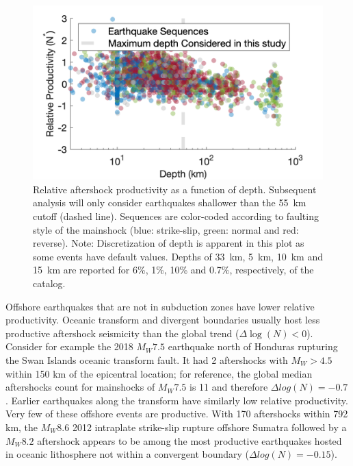 \documentclass[draft, jgrga]{agujournal2018}
\begin{document}
    \begin{figure}
        \centering
        \includegraphics{prod_vs_depth.png}
        \caption{Relative aftershock productivity as a function of depth. Subsequent analysis will only consider earthquakes shallower than the 55~km cutoff (dashed line). Sequences are color-coded according to faulting style of the mainshock (blue: strike-slip, green: normal and red: reverse). Note: Discretization of depth is apparent in this plot as some events have default values. Depths of  33~km, 5~km, 10~km and 15~km are reported for  6\%, 1\%, 10\% and 0.7\%, respectively, of the catalog.
        }
        \label{fig:prod_vs_depth}
    \end{figure}

    Offshore earthquakes that are not in subduction zones have lower relative productivity. Oceanic transform and divergent boundaries usually host less productive aftershock seismicity than the global trend ($\Delta \log(N)<0$). Consider for example the 2018 $M_W7.5$ earthquake north of Honduras rupturing the Swan Islands oceanic transform fault. It had 2 aftershocks with $M_W>4.5$ within 150 km of the epicentral location; for reference, the global median aftershocks count for mainshocks of $M_W7.5$ is 11 and therefore $\Delta log(N) = -0.7$. Earlier earthquakes along the transform have similarly low relative productivity. Very few of these offshore events are productive. With 170 aftershocks within 792 km, the $M_W8.6$ 2012 intraplate strike-slip rupture offshore Sumatra followed by a $M_W8.2$ aftershock appears to be among the most productive earthquakes hosted in oceanic lithosphere not within a convergent boundary ($\Delta log(N) = -0.15$).
\end{document}
